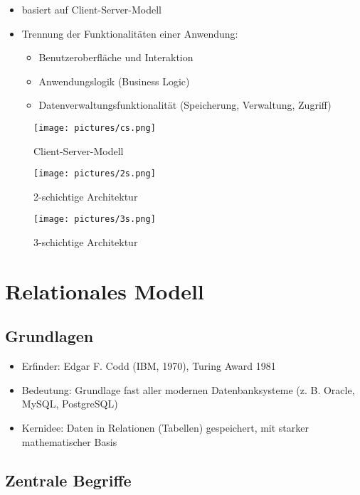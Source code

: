 \documentclass[12pt,a4paper]{article}
\begin{document}
\begin{itemize}
\item basiert auf Client-Server-Modell
\item Trennung der Funktionalitäten einer Anwendung:
\begin{itemize}
\item Benutzeroberfläche und Interaktion
\item Anwendungslogik (Business Logic)
\item Datenverwaltungsfunktionalität (Speicherung, Verwaltung, Zugriff)
\end{itemize}
\end{itemize}

\begin{figure}[H]
\centering
\begin{minipage}[t]{0.32\textwidth}
\centering
\texttt{[image: pictures/cs.png]}
\caption{Client-Server-Modell}
\end{minipage}
\hfill
\begin{minipage}[t]{0.32\textwidth}
\centering
\texttt{[image: pictures/2s.png]}
\caption{2-schichtige Architektur}
\end{minipage}
\hfill
\begin{minipage}[t]{0.32\textwidth}
\centering
\texttt{[image: pictures/3s.png]}
\caption{3-schichtige Architektur}
\end{minipage}
\end{figure}

\section{Relationales Modell}

\subsection{Grundlagen}

\begin{itemize}
\item Erfinder: Edgar F. Codd (IBM, 1970), Turing Award 1981
\item Bedeutung: Grundlage fast aller modernen Datenbanksysteme (z. B. Oracle, MySQL, PostgreSQL)
\item Kernidee: Daten in Relationen (Tabellen) gespeichert, mit starker mathematischer Basis
\end{itemize}

\subsection{Zentrale Begriffe}
\end{document}
